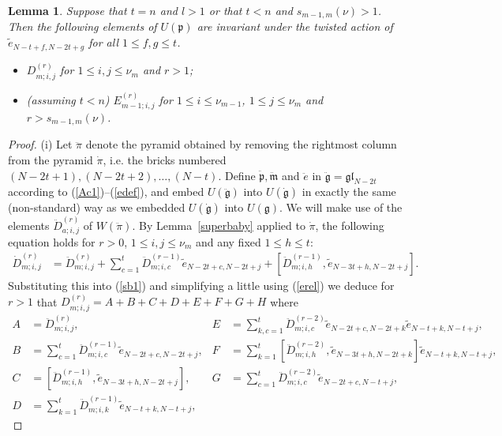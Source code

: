 \documentclass[twoside,12pt,reqno]{amsart}
\newtheorem{Lemma}[Proposition]{Lemma}
\begin{document}
\begin{Lemma}\label{hor4}
Suppose that $t = n$ and $l > 1$ or that $t < n$ and $s_{m-1,m}(\nu) > 1$.
Then the following elements of $U(\mathfrak{p})$ are
invariant under the twisted action of $\tilde e_{N-t+f,N-2t+g}$
for all $1 \leq f,g \leq t$.
\begin{itemize}
\item[(i)] $D_{m;i,j}^{(r)}$ for $1 \leq i,j \leq\nu_m$ and $r > 1$;
\item[(ii)] (assuming $t < n$)
$E_{m-1;i,j}^{(r)}$ for $1 \leq i \leq \nu_{m-1}$,
$1 \leq j \leq \nu_m$ and $r > s_{m-1,m}(\nu)$.
\end{itemize}
\end{Lemma}

\begin{proof}
(i)
Let $\ddot{\pi}$ denote the pyramid obtained by removing
the rightmost column from the pyramid $\dot\pi$, i.e. the bricks
numbered $(N-2t+1),(N-2t+2),\dots,(N-t)$.
Define $\ddot{\mathfrak{p}}, \ddot{\mathfrak{m}}$ and $\ddot e$
in $\ddot{\mathfrak{g}} = \mathfrak{gl}_{N-2t}$
according to (\ref{Ac1})--(\ref{edef}), and
embed $U(\ddot{\mathfrak{g}})$ 
into $U(\dot{\mathfrak{g}})$ in exactly the same (non-standard) way as we 
embedded $U(\dot{\mathfrak{g}})$ into $U(\mathfrak{g})$.
We will make use of the elements
$\ddot{D}_{a;i,j}^{(r)}$
of $W(\ddot{\pi})$.
By Lemma~\ref{superbaby} applied to $\dot\pi$,
the following equation holds for $r > 0$,
$1 \leq i,j \leq \nu_m$ and
any fixed $1 \leq h \leq t$:
\begin{align*}
\dot D_{m;i,j}^{(r)} & = \ddot{D}_{m;i,j}^{(r)} + 
\sum_{c=1}^t
\ddot{D}_{m;i,c}^{(r-1)} \tilde e_{N-2t+c,N-2t+j}
+
[\ddot{D}_{m;i,h}^{(r-1)}, \tilde e_{N-3t+h,N-2t+j}].
\end{align*}
Substituting this into (\ref{sb1}) and simplifying
a little using (\ref{erel}) we deduce for $r > 1$ that
$D_{m;i,j}^{(r)}= A+B+C+D+E+F+G+H$
where
\begin{align*}
A &= \ddot{D}_{m;i,j}^{(r)},
&E &=\sum_{k,c=1}^t \ddot{D}_{m;i,c}^{(r-2)}
\tilde e_{N-2t+c,N-2t+k}\tilde e_{N-t+k,N-t+j},\\
B &= \sum_{c=1}^t \ddot{D}_{m;i,c}^{(r-1)}\tilde e_{N-2t+c,N-2t+j},
&F &=\sum_{k=1}^t
[\ddot{D}_{m;i,h}^{(r-2)}, \tilde e_{N-3t+h,N-2t+k}]\tilde e_{N-t+k,N-t+j},\\
C &=[\ddot{D}_{m;i,h}^{(r-1)}, \tilde e_{N-3t+h,N-2t+j}],
&G &=\sum_{c=1}^t\ddot{D}_{m;i,c}^{(r-2)} \tilde e_{N-2t+c,N-t+j},\\
D &=\sum_{k=1}^t
\ddot{D}_{m;i,k}^{(r-1)}\tilde e_{N-t+k,N-t+j},

\end{align*}
\end{proof}
\end{document}
